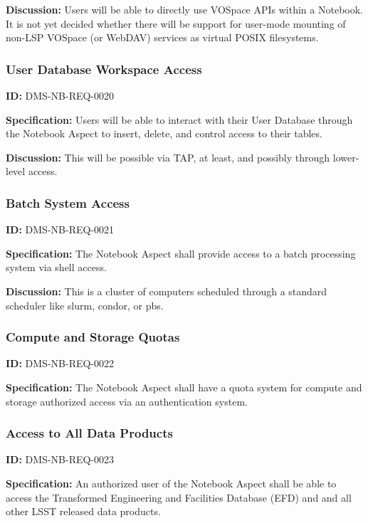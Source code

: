 \documentclass[SE,toc]{lsstdoc}
\begin{document}
\textbf{Discussion:}
Users will be able to directly use VOSpace APIs within a Notebook.  It is not yet decided whether there will be support for user-mode mounting of non-LSP VOSpace (or WebDAV) services as virtual POSIX filesystems.

\subsubsection{User Database Workspace Access}

\label{DMS-NB-REQ-0020}
\textbf{ID:} DMS-NB-REQ-0020

\textbf{Specification:}
Users will be able to interact with their User Database through the Notebook Aspect to insert, delete, and control access to their tables.

\textbf{Discussion:}
This will be possible via TAP, at least, and possibly through lower-level access.

\subsubsection{Batch System Access}

\label{DMS-NB-REQ-0021}
\textbf{ID:} DMS-NB-REQ-0021

\textbf{Specification:}
The Notebook Aspect shall provide access to a batch processing system via shell access.

\textbf{Discussion:}
This is a cluster of computers scheduled through a standard scheduler like slurm, condor, or pbs.

\subsubsection{Compute and Storage Quotas}

\label{DMS-NB-REQ-0022}
\textbf{ID:} DMS-NB-REQ-0022

\textbf{Specification:}
The Notebook Aspect shall have a quota system for compute and storage authorized access via an authentication system.

\subsubsection{Access to All Data Products}

\label{DMS-NB-REQ-0023}
\textbf{ID:} DMS-NB-REQ-0023

\textbf{Specification:}
An authorized user of the Notebook Aspect shall be able to access the Transformed Engineering and Facilities Database (EFD) and and all other LSST released data products.
\end{document}
